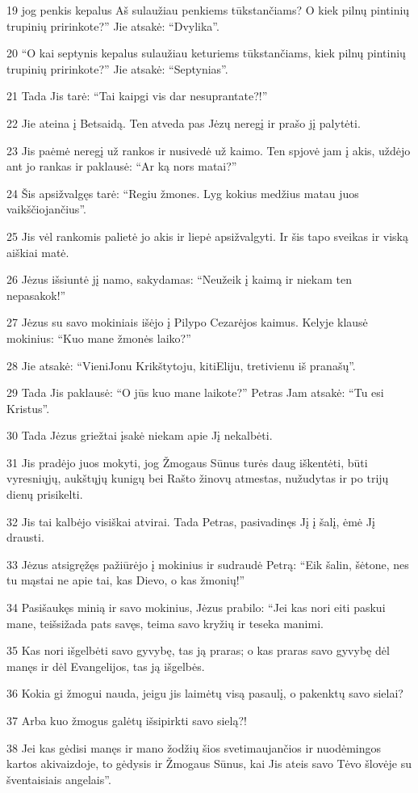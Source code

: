\par 19 jog penkis kepalus Aš sulaužiau penkiems tūkstančiams? O kiek pilnų pintinių trupinių pririnkote?” Jie atsakė: “Dvylika”. 
\par 20 “O kai septynis kepalus sulaužiau keturiems tūkstančiams, kiek pilnų pintinių trupinių pririnkote?” Jie atsakė: “Septynias”. 
\par 21 Tada Jis tarė: “Tai kaipgi vis dar nesuprantate?!” 
\par 22 Jie ateina į Betsaidą. Ten atveda pas Jėzų neregį ir prašo jį palytėti. 
\par 23 Jis paėmė neregį už rankos ir nusivedė už kaimo. Ten spjovė jam į akis, uždėjo ant jo rankas ir paklausė: “Ar ką nors matai?” 
\par 24 Šis apsižvalgęs tarė: “Regiu žmones. Lyg kokius medžius matau juos vaikščiojančius”. 
\par 25 Jis vėl rankomis palietė jo akis ir liepė apsižvalgyti. Ir šis tapo sveikas ir viską aiškiai matė. 
\par 26 Jėzus išsiuntė jį namo, sakydamas: “Neužeik į kaimą ir niekam ten nepasakok!” 
\par 27 Jėzus su savo mokiniais išėjo į Pilypo Cezarėjos kaimus. Kelyje klausė mokinius: “Kuo mane žmonės laiko?” 
\par 28 Jie atsakė: “Vieni­Jonu Krikštytoju, kiti­Eliju, treti­vienu iš pranašų”. 
\par 29 Tada Jis paklausė: “O jūs kuo mane laikote?” Petras Jam atsakė: “Tu esi Kristus”. 
\par 30 Tada Jėzus griežtai įsakė niekam apie Jį nekalbėti. 
\par 31 Jis pradėjo juos mokyti, jog Žmogaus Sūnus turės daug iškentėti, būti vyresniųjų, aukštųjų kunigų bei Rašto žinovų atmestas, nužudytas ir po trijų dienų prisikelti. 
\par 32 Jis tai kalbėjo visiškai atvirai. Tada Petras, pasivadinęs Jį į šalį, ėmė Jį drausti. 
\par 33 Jėzus atsigręžęs pažiūrėjo į mokinius ir sudraudė Petrą: “Eik šalin, šėtone, nes tu mąstai ne apie tai, kas Dievo, o kas žmonių!” 
\par 34 Pasišaukęs minią ir savo mokinius, Jėzus prabilo: “Jei kas nori eiti paskui mane, teišsižada pats savęs, teima savo kryžių ir teseka manimi. 
\par 35 Kas nori išgelbėti savo gyvybę, tas ją praras; o kas praras savo gyvybę dėl manęs ir dėl Evangelijos, tas ją išgelbės. 
\par 36 Kokia gi žmogui nauda, jeigu jis laimėtų visą pasaulį, o pakenktų savo sielai? 
\par 37 Arba kuo žmogus galėtų išsipirkti savo sielą?! 
\par 38 Jei kas gėdisi manęs ir mano žodžių šios svetimaujančios ir nuodėmingos kartos akivaizdoje, to gėdysis ir Žmogaus Sūnus, kai Jis ateis savo Tėvo šlovėje su šventaisiais angelais”.



